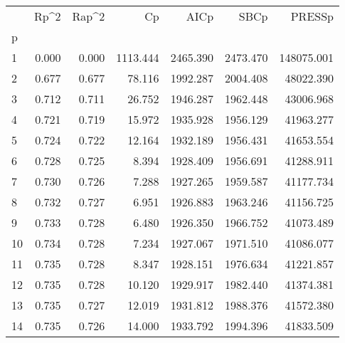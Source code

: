 \begin{tabular}{lrrrrrr}
\toprule
{} &   Rp\textasciicircum 2 &  Rap\textasciicircum 2 &        Cp &      AICp &      SBCp &      PRESSp \\
p  &        &        &           &           &           &             \\
\midrule
1  &  0.000 &  0.000 &  1113.444 &  2465.390 &  2473.470 &  148075.001 \\
2  &  0.677 &  0.677 &    78.116 &  1992.287 &  2004.408 &   48022.390 \\
3  &  0.712 &  0.711 &    26.752 &  1946.287 &  1962.448 &   43006.968 \\
4  &  0.721 &  0.719 &    15.972 &  1935.928 &  1956.129 &   41963.277 \\
5  &  0.724 &  0.722 &    12.164 &  1932.189 &  1956.431 &   41653.554 \\
6  &  0.728 &  0.725 &     8.394 &  1928.409 &  1956.691 &   41288.911 \\
7  &  0.730 &  0.726 &     7.288 &  1927.265 &  1959.587 &   41177.734 \\
8  &  0.732 &  0.727 &     6.951 &  1926.883 &  1963.246 &   41156.725 \\
9  &  0.733 &  0.728 &     6.480 &  1926.350 &  1966.752 &   41073.489 \\
10 &  0.734 &  0.728 &     7.234 &  1927.067 &  1971.510 &   41086.077 \\
11 &  0.735 &  0.728 &     8.347 &  1928.151 &  1976.634 &   41221.857 \\
12 &  0.735 &  0.728 &    10.120 &  1929.917 &  1982.440 &   41374.381 \\
13 &  0.735 &  0.727 &    12.019 &  1931.812 &  1988.376 &   41572.380 \\
14 &  0.735 &  0.726 &    14.000 &  1933.792 &  1994.396 &   41833.509 \\
\bottomrule
\end{tabular}
